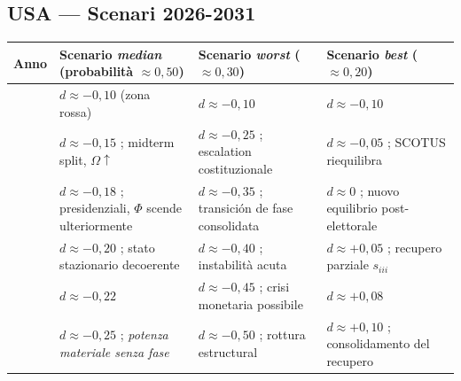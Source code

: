 \subsection{USA --- Scenari 2026-2031}\label{usa-scenari-2026-2031}

{\def\LTcaptype{none} %
{\small\begin{longtable}[]{@{}
  >{\raggedright\arraybackslash}p{}
  >{\raggedright\arraybackslash}p{}
  >{\raggedright\arraybackslash}p{}
  >{\raggedright\arraybackslash}p{}@{}}
\toprule\noalign{}
\begin{minipage}[b]{\linewidth}\raggedright
Anno
\end{minipage} & \begin{minipage}[b]{\linewidth}\raggedright
Scenario \emph{median} (probabilità \(\approx 0{,}50\))
\end{minipage} & \begin{minipage}[b]{\linewidth}\raggedright
Scenario \emph{worst} (\(\approx 0{,}30\))
\end{minipage} & \begin{minipage}[b]{\linewidth}\raggedright
Scenario \emph{best} (\(\approx 0{,}20\))
\end{minipage} \\
\midrule\noalign{}
\endhead
\bottomrule\noalign{}
\endlastfoot
2026 & \(d \approx -0{,}10\) (zona rossa) & \(d \approx -0{,}10\) &
\(d \approx -0{,}10\) \\
2027 & \(d \approx -0{,}15\) ; midterm split, \(\Omega \uparrow\) &
\(d \approx -0{,}25\) ; escalation costituzionale &
\(d \approx -0{,}05\) ; SCOTUS riequilibra \\
2028 & \(d \approx -0{,}18\) ; presidenziali, \(\Phi\) scende
ulteriormente & \(d \approx -0{,}35\) ; transición de fase consolidata
& \(d \approx 0\) ; nuovo equilibrio post-elettorale \\
2029 & \(d \approx -0{,}20\) ; stato stazionario decoerente &
\(d \approx -0{,}40\) ; instabilità acuta & \(d \approx +0{,}05\) ;
recupero parziale \(s_{iii}\) \\
2030 & \(d \approx -0{,}22\) & \(d \approx -0{,}45\) ; crisi monetaria
possibile & \(d \approx +0{,}08\) \\
2031 & \(d \approx -0{,}25\) ; \emph{potenza materiale senza fase} &
\(d \approx -0{,}50\) ; rottura estructural & \(d \approx +0{,}10\) ;
consolidamento del recupero \\
\end{longtable}}
}

